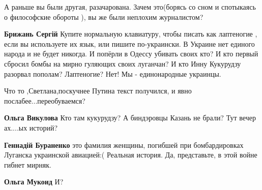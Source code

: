 \begin{itemize}
\begin{itemize}
А раньше вы были другая, разачарована. Зачем это(борясь со сном и спотыкаясь о
философские обороты ), вы же были неплохим журналистом?

 
\textbf{Брижань Сергій} Купите нормальную клавиатуру, чтобы писать как лаптеногие , если вы используете их язык, или пишите по-украински.
В Украине нет единого народа и не будет никогда.
И попёрли в Одессу убивать своих кто? И кто первый сбросил бомбы на мирно гуляющих своих луганчан? И кто Инну Кукурудзу разорвал пополам?
Лаптеногие? Нет! Мы - единонародные украинцы.

 
Что то ,Светлана,поскучнее Путина текст получился, и явно послабее...переобуваемся?

 
\textbf{Ольга Викулова} Кто там кукурудзу? А биндэровцы Казань не брали? Тут вечер ах....ых историй?

 
\textbf{Геннадій Бураненко} это фамилия женщины, погибшей при бомбардировках Луганска украинской авиацией:( Реальная история. Да, представьте, в этой войне гибнет мирняк.

 
\textbf{Ольга Мукоид} И?

 

\end{itemize}
\end{itemize}
